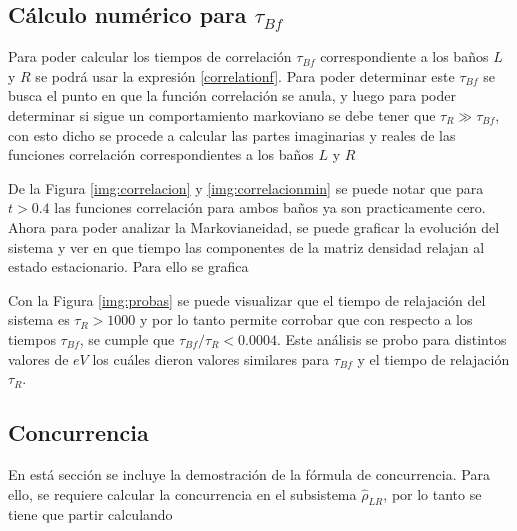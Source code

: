 \begin{appendixs}
\label{appendix5correlation}

\subsection{Cálculo numérico para $\tau_{Bf}$}
Para poder calcular los tiempos de correlación $\tau_{Bf}$ correspondiente a los baños $L$ y $R$ se podrá usar la expresión \ref{correlationf}. Para poder determinar este $\tau_{Bf}$ se busca el punto en que la función correlación se anula, y luego para poder determinar si sigue un comportamiento markoviano se debe tener que $\tau_{R}\gg \tau_{Bf}$, con esto dicho se procede a calcular las partes imaginarias y reales de las funciones correlación correspondientes a los baños $L$ y $R$ 


De la Figura \ref{img:correlacion} y \ref{img:correlacionmin} se puede notar que para $t>0.4$ las funciones correlación para ambos baños ya son practicamente cero. Ahora para poder analizar la Markovianeidad, se puede graficar la evolución del sistema y ver en que tiempo las componentes de la matriz densidad relajan al estado estacionario. Para ello se grafica 



Con la Figura \ref{img:probas} se puede visualizar que el tiempo de relajación del sistema es $\tau_{R}>1000$ y por lo tanto permite corrobar que con respecto a los tiempos $\tau_{Bf}$, se cumple que $\tau_{Bf}/\tau_{R} < 0.0004 $. Este análisis se probo para distintos valores de $eV$ los cuáles dieron valores similares para $\tau_{Bf}$ y el tiempo de relajación $\tau_{R}$. 

\label{appendix5tauf}

\newpage 

\subsection{Concurrencia}
En está sección se incluye la demostración de la fórmula de concurrencia. Para ello, se requiere calcular la concurrencia en el subsistema $\hat{\rho}_{LR}$, por lo tanto se tiene que partir calculando 


\end{appendixs}

